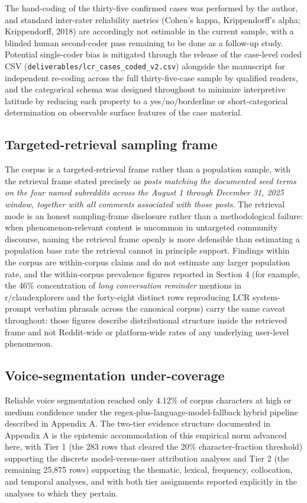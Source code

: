 \documentclass[11pt]{article}
\begin{document}
The hand-coding of the thirty-five confirmed cases was performed by the author, and standard inter-rater reliability metrics (Cohen's kappa, Krippendorff's alpha; Krippendorff, 2018) are accordingly not estimable in the current sample, with a blinded human second-coder pass remaining to be done as a follow-up study. Potential single-coder bias is mitigated through the release of the case-level coded CSV (\texttt{deliverables/lcr\_cases\_coded\_v2.csv}) alongside the manuscript for independent re-coding across the full thirty-five-case sample by qualified readers, and the categorical schema was designed throughout to minimize interpretive latitude by reducing each property to a yes/no/borderline or short-categorical determination on observable surface features of the case material.

\subsection{Targeted-retrieval sampling frame}

The corpus is a targeted-retrieval frame rather than a population sample, with the retrieval frame stated precisely as \emph{posts matching the documented seed terms on the four named subreddits across the August 1 through December 31, 2025 window, together with all comments associated with those posts}. The retrieval mode is an honest sampling-frame disclosure rather than a methodological failure: when phenomenon-relevant content is uncommon in untargeted community discourse, naming the retrieval frame openly is more defensible than estimating a population base rate the retrieval cannot in principle support. Findings within the corpus are within-corpus claims and do not estimate any larger population rate, and the within-corpus prevalence figures reported in Section 4 (for example, the 46\% concentration of \emph{long conversation reminder} mentions in r/claudexplorers and the forty-eight distinct rows reproducing LCR system-prompt verbatim phrasals across the canonical corpus) carry the same caveat throughout: those figures describe distributional structure inside the retrieved frame and not Reddit-wide or platform-wide rates of any underlying user-level phenomenon.

\subsection{Voice-segmentation under-coverage}

Reliable voice segmentation reached only 4.12\% of corpus characters at high or medium confidence under the regex-plus-language-model-fallback hybrid pipeline described in Appendix A. The two-tier evidence structure documented in Appendix A is the epistemic accommodation of this empirical norm advanced here, with Tier 1 (the 283 rows that cleared the 20\% character-fraction threshold) supporting the discrete model-versus-user attribution analyses and Tier 2 (the remaining 25,875 rows) supporting the thematic, lexical, frequency, collocation, and temporal analyses, and with both tier assignments reported explicitly in the analyses to which they pertain.
\end{document}
